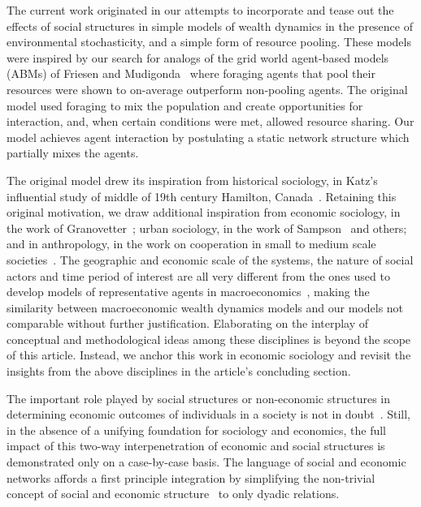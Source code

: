 \documentclass[sigconf]{acmart}
\begin{document}
The current work originated in our attempts to incorporate and tease out the effects of social structures in simple models of wealth dynamics in the presence of environmental stochasticity, and a simple form of resource pooling. These models were inspired by our search for analogs of the grid world agent-based models (ABMs) of Friesen and Mudigonda~\cite{srimil} where foraging agents that pool their resources were shown to on-average outperform non-pooling agents. The original model used foraging to mix the population and create opportunities for interaction, and, when certain conditions were met, allowed resource sharing. Our model achieves agent interaction by postulating a static network structure which partially mixes the agents. 

The original model drew its inspiration from historical sociology, in Katz's influential study of middle of 19th century Hamilton, Canada~\cite{katz2013people}. Retaining this original motivation, we draw additional inspiration from economic sociology, in the work of Granovetter~\cite{granovetter2005}; urban sociology, in the work of Sampson~\cite{sampson2002} and others; and in anthropology, in the work on cooperation in small to medium scale societies~\cite{avner1994,white2011kinship}. The geographic and economic scale of the systems, the nature of social actors and time period of interest are all very different from the ones used to develop models of representative agents in macroeconomics~\cite{benhabib2018}, making the similarity between macroeconomic wealth dynamics models and our models not comparable without further justification. Elaborating on the interplay of conceptual and methodological ideas among these disciplines is beyond the scope of this article. Instead, we anchor this work in economic sociology and revisit the insights from the above disciplines in the article's concluding section.

The important role played by social structures or non-economic structures in determining economic outcomes of individuals in a society is not in doubt~\cite{granovetter2005,jackson_rev2017}. Still, in the absence of a unifying foundation for sociology and economics, the full impact of this two-way interpenetration of economic and social structures is demonstrated only on a case-by-case basis. The language of social and economic networks affords a first principle integration by simplifying the non-trivial concept of social and economic structure~\cite{martin_lee} to only dyadic relations. 
\end{document}

